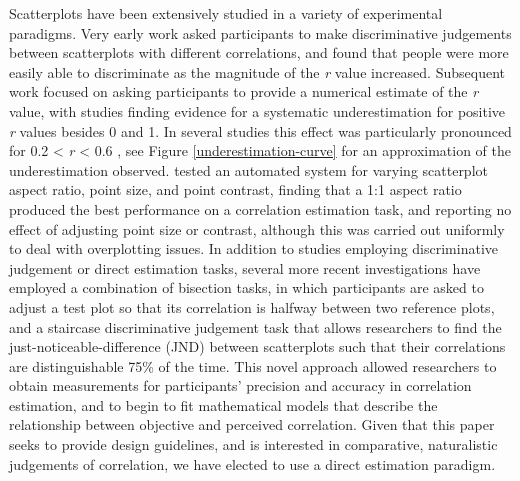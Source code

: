 \documentclass[preprint, 3p,
authoryear]{elsarticle} %
\begin{document}
Scatterplots have been extensively studied in a variety of experimental
paradigms. Very early work \citep{pollack_1960} asked participants to
make discriminative judgements between scatterplots with different
correlations, and found that people were more easily able to
discriminate as the magnitude of the \emph{r} value increased.
Subsequent work focused on asking participants to provide a numerical
estimate of the \emph{r} value, with studies finding evidence for a
systematic underestimation for positive \emph{r} values besides 0 and 1.
In several studies this effect was particularly pronounced for 0.2
\textless{} \emph{r} \textless{} 0.6
\citep{strahan_1978, bobko_1979, cleveland_1982, lane_1985, lauer_1989, collyer_1990, meyer_1992},
see Figure \ref{underestimation-curve} for an approximation of the
underestimation observed. \citet{micallef_2017} tested an automated
system for varying scatterplot aspect ratio, point size, and point
contrast, finding that a 1:1 aspect ratio produced the best performance
on a correlation estimation task, and reporting no effect of adjusting
point size or contrast, although this was carried out uniformly to deal
with overplotting issues. In addition to studies employing
discriminative judgement or direct estimation tasks, several more recent
investigations have employed a combination of bisection tasks, in which
participants are asked to adjust a test plot so that its correlation is
halfway between two reference plots, and a staircase discriminative
judgement task that allows researchers to find the
just-noticeable-difference (JND) between scatterplots such that their
correlations are distinguishable 75\% of the time. This novel approach
\citep{rensink_2010} allowed researchers to obtain measurements for
participants' precision and accuracy in correlation estimation, and to
begin to fit mathematical models that describe the relationship between
objective and perceived correlation. Given that this paper seeks to
provide design guidelines, and is interested in comparative,
naturalistic judgements of correlation, we have elected to use a direct
estimation paradigm.
\end{document}
